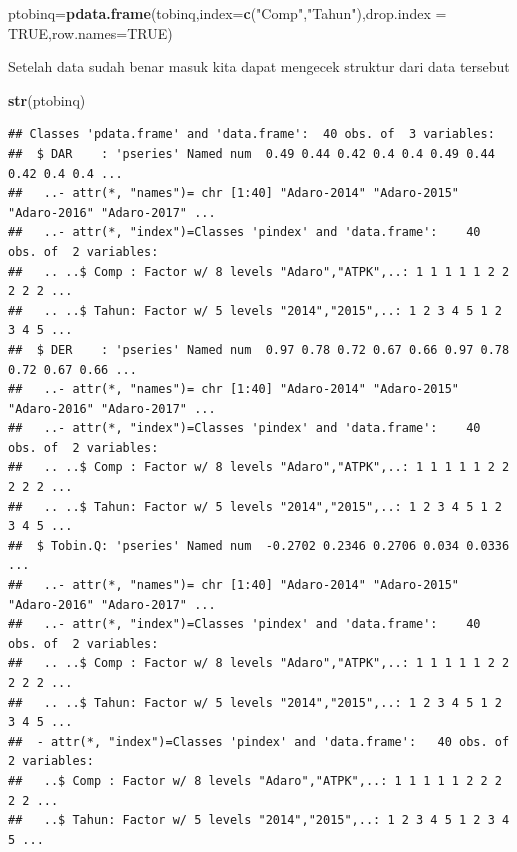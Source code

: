 \documentclass[
]{book}
\newenvironment{Shaded}{\begin{snugshade}}{\end{snugshade}}
\newcommand{\AttributeTok}[1]{\textcolor[rgb]{0.13,0.29,0.53}{#1}}
\newcommand{\ConstantTok}[1]{\textcolor[rgb]{0.56,0.35,0.01}{#1}}
\newcommand{\FunctionTok}[1]{\textcolor[rgb]{0.13,0.29,0.53}{\textbf{#1}}}
\newcommand{\NormalTok}[1]{#1}
\newcommand{\OtherTok}[1]{\textcolor[rgb]{0.56,0.35,0.01}{#1}}
\newcommand{\StringTok}[1]{\textcolor[rgb]{0.31,0.60,0.02}{#1}}
\theoremstyle{definition}
\theoremstyle{definition}
\theoremstyle{definition}
\theoremstyle{definition}
\theoremstyle{remark}
\begin{document}
\begin{Shaded}
\begin{Highlighting}[]
\NormalTok{ptobinq}\OtherTok{=}\FunctionTok{pdata.frame}\NormalTok{(tobinq,}\AttributeTok{index=}\FunctionTok{c}\NormalTok{(}\StringTok{"Comp"}\NormalTok{,}\StringTok{"Tahun"}\NormalTok{),}\AttributeTok{drop.index =} \ConstantTok{TRUE}\NormalTok{,}\AttributeTok{row.names=}\ConstantTok{TRUE}\NormalTok{)}
\end{Highlighting}
\end{Shaded}

Setelah data sudah benar masuk kita dapat mengecek struktur dari data tersebut

\begin{Shaded}
\begin{Highlighting}[]
\FunctionTok{str}\NormalTok{(ptobinq)}
\end{Highlighting}
\end{Shaded}

\begin{verbatim}
## Classes 'pdata.frame' and 'data.frame':  40 obs. of  3 variables:
##  $ DAR    : 'pseries' Named num  0.49 0.44 0.42 0.4 0.4 0.49 0.44 0.42 0.4 0.4 ...
##   ..- attr(*, "names")= chr [1:40] "Adaro-2014" "Adaro-2015" "Adaro-2016" "Adaro-2017" ...
##   ..- attr(*, "index")=Classes 'pindex' and 'data.frame':    40 obs. of  2 variables:
##   .. ..$ Comp : Factor w/ 8 levels "Adaro","ATPK",..: 1 1 1 1 1 2 2 2 2 2 ...
##   .. ..$ Tahun: Factor w/ 5 levels "2014","2015",..: 1 2 3 4 5 1 2 3 4 5 ...
##  $ DER    : 'pseries' Named num  0.97 0.78 0.72 0.67 0.66 0.97 0.78 0.72 0.67 0.66 ...
##   ..- attr(*, "names")= chr [1:40] "Adaro-2014" "Adaro-2015" "Adaro-2016" "Adaro-2017" ...
##   ..- attr(*, "index")=Classes 'pindex' and 'data.frame':    40 obs. of  2 variables:
##   .. ..$ Comp : Factor w/ 8 levels "Adaro","ATPK",..: 1 1 1 1 1 2 2 2 2 2 ...
##   .. ..$ Tahun: Factor w/ 5 levels "2014","2015",..: 1 2 3 4 5 1 2 3 4 5 ...
##  $ Tobin.Q: 'pseries' Named num  -0.2702 0.2346 0.2706 0.034 0.0336 ...
##   ..- attr(*, "names")= chr [1:40] "Adaro-2014" "Adaro-2015" "Adaro-2016" "Adaro-2017" ...
##   ..- attr(*, "index")=Classes 'pindex' and 'data.frame':    40 obs. of  2 variables:
##   .. ..$ Comp : Factor w/ 8 levels "Adaro","ATPK",..: 1 1 1 1 1 2 2 2 2 2 ...
##   .. ..$ Tahun: Factor w/ 5 levels "2014","2015",..: 1 2 3 4 5 1 2 3 4 5 ...
##  - attr(*, "index")=Classes 'pindex' and 'data.frame':   40 obs. of  2 variables:
##   ..$ Comp : Factor w/ 8 levels "Adaro","ATPK",..: 1 1 1 1 1 2 2 2 2 2 ...
##   ..$ Tahun: Factor w/ 5 levels "2014","2015",..: 1 2 3 4 5 1 2 3 4 5 ...
\end{verbatim}
\end{document}
